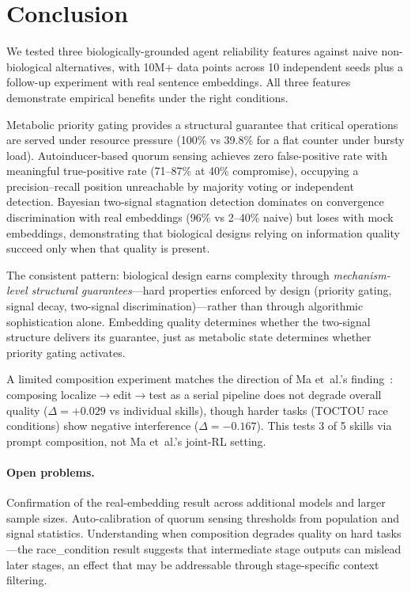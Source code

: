 \section{Conclusion}\label{sec:conclusion}

We tested three biologically-grounded agent reliability features
against naive non-biological alternatives, with 10M+ data points
across 10 independent seeds plus a follow-up experiment with real
sentence embeddings.  All three features demonstrate empirical
benefits under the right conditions.

Metabolic priority gating provides a structural guarantee that
critical operations are served under resource pressure (100\% vs
39.8\% for a flat counter under bursty load).  Autoinducer-based
quorum sensing achieves zero false-positive rate with meaningful
true-positive rate (71--87\% at 40\% compromise), occupying a
precision--recall position unreachable by majority voting or
independent detection.  Bayesian two-signal stagnation detection
dominates on convergence discrimination with real embeddings
(96\% vs 2--40\% naive) but loses with mock embeddings, demonstrating
that biological designs relying on information quality succeed only
when that quality is present.

The consistent pattern: biological design earns complexity through
\emph{mechanism-level structural guarantees}---hard properties enforced
by design (priority gating, signal decay, two-signal discrimination)---rather
than through algorithmic sophistication alone.  Embedding quality
determines whether the two-signal structure delivers its guarantee,
just as metabolic state determines whether priority gating activates.

A limited composition experiment matches the direction of Ma et~al.'s
finding~\cite{ma2026atomic}: composing localize$\to$edit$\to$test as
a serial pipeline does not degrade overall quality ($\Delta = +0.029$
vs individual skills), though harder tasks (TOCTOU race conditions)
show negative interference ($\Delta = -0.167$).  This tests 3 of 5
skills via prompt composition, not Ma et~al.'s joint-RL setting.

\paragraph{Open problems.}
Confirmation of the real-embedding result across additional models
and larger sample sizes.  Auto-calibration of quorum sensing thresholds
from population and signal statistics.  Understanding when composition
degrades quality on hard tasks---the race\_condition result suggests
that intermediate stage outputs can mislead later stages, an effect
that may be addressable through stage-specific context filtering.
